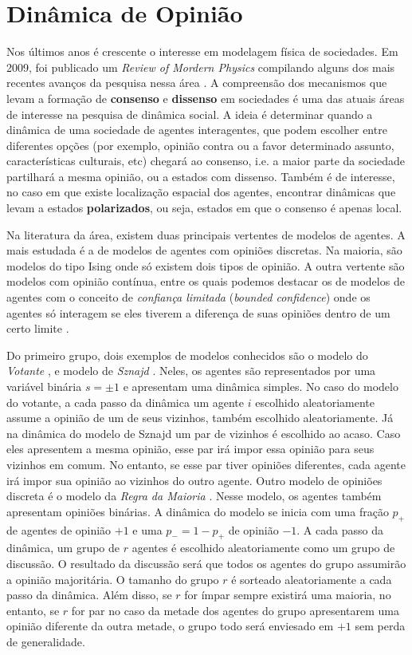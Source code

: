 \chapter{Dinâmica de Opinião} %


Nos últimos anos é crescente o interesse em modelagem física de
sociedades. Em 2009, foi publicado um \textit{Review of Mordern Physics}
compilando alguns dos mais recentes avanços da pesquisa nessa área
. A compreensão dos mecanismos que levam a formação
de \textbf{consenso} e \textbf{dissenso} em sociedades é uma das atuais
áreas de interesse na pesquisa de dinâmica social.  A ideia é determinar
quando a dinâmica de uma sociedade de agentes interagentes, que podem
escolher entre diferentes opções (por exemplo, opinião contra ou a favor
determinado assunto, características culturais, etc) chegará ao consenso,
i.e. a maior parte da sociedade partilhará a mesma opinião, ou a estados com
dissenso. Também é de interesse, no caso em que existe localização espacial
dos agentes, encontrar dinâmicas que levam a estados \textbf{polarizados},
ou seja, estados em que o consenso é apenas local.

Na literatura da área, existem duas principais vertentes de modelos
de agentes.  A mais estudada é a de modelos de agentes com opiniões
discretas. Na maioria, são modelos do tipo Ising onde só existem dois
tipos de opinião. A outra vertente são modelos com opinião contínua,
entre os quais podemos destacar os de modelos de agentes com o conceito de
\textit{confiança limitada} (\textit{bounded confidence}) onde os agentes
só interagem se eles tiverem a diferença de suas opiniões dentro de um
certo limite \citep{Deffuant2000, Hegselmann2002, Lorenz2007}.

Do primeiro grupo, dois exemplos de modelos conhecidos são o modelo
do \textit{Votante} \cite{Holley1975a}, e modelo de \textit{Sznajd}
\cite{Sznajd2000}. Neles, os agentes são representados por uma variável
binária $s= \pm 1$ e apresentam uma dinâmica simples. No caso do
modelo do votante, a cada passo da dinâmica um agente $i$ escolhido
aleatoriamente assume a opinião de um de seus vizinhos, também escolhido
aleatoriamente. Já na dinâmica do modelo de Sznajd um par de vizinhos é
escolhido ao acaso. Caso eles apresentem a mesma opinião, esse par irá
impor essa opinião para seus vizinhos em comum. No entanto, se esse par
tiver opiniões diferentes, cada agente irá impor sua opinião ao vizinhos do
outro agente.  Outro modelo de opiniões discreta é o modelo da \textit{Regra
da Maioria} \cite{Galam1986}. Nesse modelo, os agentes também apresentam
opiniões binárias. A dinâmica do modelo se inicia com uma fração $p_+$
de agentes de opinião $+1$ e uma $ p_- = 1 - p_+$ de opinião $-1$. A cada
passo da dinâmica, um grupo de $r$ agentes é escolhido aleatoriamente
como um grupo de discussão. O resultado da discussão será que todos os
agentes do grupo assumirão a opinião majoritária. O tamanho do grupo $r$
é sorteado aleatoriamente a cada passo da dinâmica. Além disso, se $r$
for ímpar sempre existirá uma maioria, no entanto, se $r$ for par no caso
da metade dos agentes do grupo apresentarem uma opinião diferente da outra
metade, o grupo todo será enviesado em $+1$ sem perda de generalidade.

